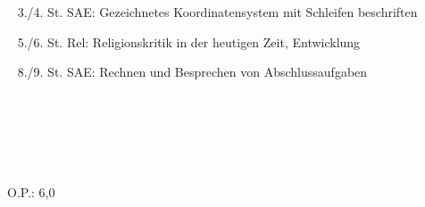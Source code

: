 {{	\textbullet~ 3./4. St. SAE: Gezeichnetes Koordinatensystem mit Schleifen beschriften\par
	\textbullet~ 5./6. St. Rel: Religionskritik in der heutigen Zeit, Entwicklung\par
	\textbullet~ 8./9. St. SAE: Rechnen und Besprechen von Abschlussaufgaben\par
	\textbullet~ \par
	\textbullet~ \par
	\textbullet~ 
	}{}{O.P.: 6,0}
}{}
\Unterschrift
\newpage
